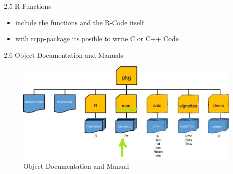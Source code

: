 \documentclass[11pt,a4paper]{beamer}
\begin{document}
\begin{frame}[t]{2.5 R-Functions}
	
	\begin{itemize}
		\item  include the functions and the R-Code itself
		\item with rcpp-package its posible to write C or C++ Code
		
			
	\end{itemize}
	
\end{frame}






























































\begin{frame}[t]{2.6 Object Documentation and Manuals}
	
	
	\begin{figure}
		\centering
		\includegraphics[width=0.9\linewidth]{Manu}
		\caption{Object Documentation and Manual}
		\label{fig:packages}
	\end{figure}
	
	
\end{frame}
\end{document}
